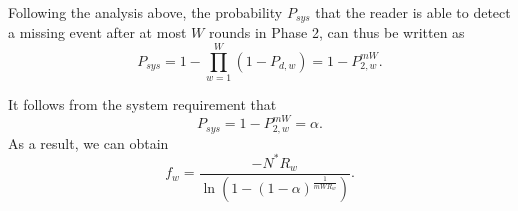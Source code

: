 \documentclass[10pt, twocolumn]{IEEEtran}
\begin{document}
Following the analysis above, the probability $P_{sys}$ that the reader is able to detect a missing event after at most $W$ rounds in Phase 2, can thus be written as
\begin{equation}
P_{sys}=1-\prod_{w=1}^{W}{(1-P_{d,w})} = 1- P^{mW}_{2,w}.
\end{equation}

\begin{comment}
Since $N^* = |\mathbb{E}|-m+ |\mathbb{U}_r|$, it can be checked that the detection probability $P_{sys}$ is monotonically increasing and $p_{2,w}$ is monotonically decreasing with respect to the number of missing tags $m$, meaning that $m=M$ makes the detection hardest and any greater $m$ will ease the hardness. It is thus reasonable to use $m=M$ in the rest of the analysis, because if the reader can detect a missing tag event with probability $\alpha$ when $m=M$, it will fulfill the detection with probability $P_{sys}>\alpha$ when $m>M$.

Let $N^*=N$ for the case that $m=M$, thus we have
\begin{eqnarray}
\begin{cases}
 N = |\mathbb{E}|-M+ |\mathbb{U}_r|, \\
 E[N]= |\mathbb{E}|-M+|\mathbb{U}| \big(\frac{1}{2} \big)^{\sum_{j=1}^{J} k_j}.
\end{cases}
\label{Eq:N}
\end{eqnarray}

To guarantee the system requirement on the detection probability, the detection probability should be at least equal to $\alpha$ in the worst case, we thus let
\begin{equation}
P_{sys}=1- P^{MW}_{2,w} = \alpha.
\label{Eq:P_system}
\end{equation}
and have
\begin{equation}
f_w= \frac{-N R_w}{\ln (1- (1-\alpha)^{\frac{1}{M W R_w}})}.
\label{Eq:fw}
\end{equation}
\end{comment}

It follows from the system requirement that
\begin{equation}
P_{sys}=1- P^{mW}_{2,w} = \alpha.
\label{Eq:P_system}
\end{equation}
As a result, we can obtain
\begin{equation}
f_w= \frac{-N^* R_w}{\ln (1- (1-\alpha)^{\frac{1}{m W R_w}})}.
\label{Eq:fw}
\end{equation}
\end{document}
